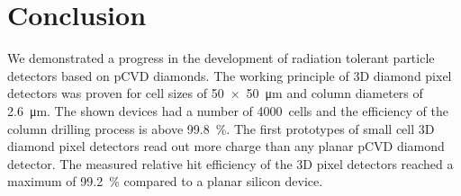 \section{Conclusion}
We demonstrated a progress in the development of radiation tolerant particle detectors based on \ac{pCVD} diamonds. The working principle of 3D diamond pixel detectors was proven for cell sizes of \SI{50x50}{\micro\meter} and column diameters of \SI{2.6}{\micro\meter}. The shown devices had a number of \SI{4000}{cells} and the efficiency of the column drilling process is above \SI{99.8}{\%}. The first prototypes of small cell 3D diamond pixel detectors read out more charge than any planar \ac{pCVD} diamond detector. The measured relative hit efficiency of the 3D pixel detectors reached a maximum of \SI{99.2}{\%} compared to a planar silicon device.\par